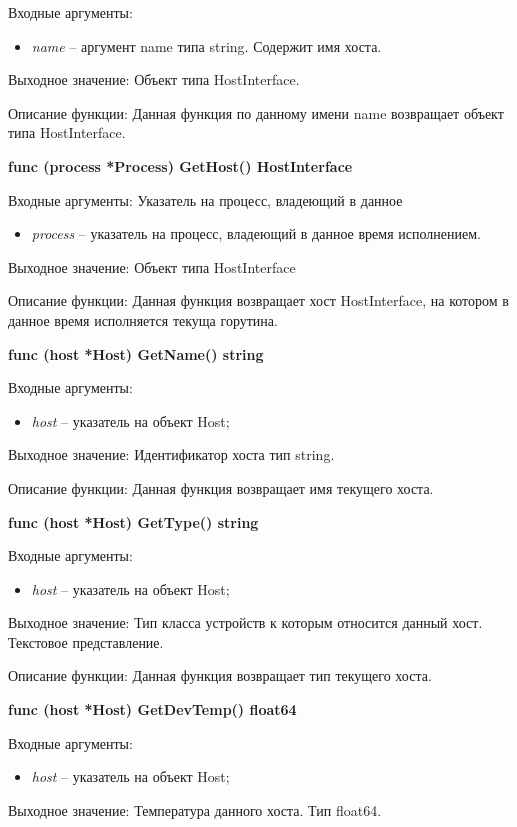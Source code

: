 Входные аргументы: 
\begin{itemize}
	\item \textit{name} -- аргумент name типа string. Содержит имя хоста.
\end{itemize}
Выходное значение: Объект типа HostInterface.

Описание функции: Данная функция по данному имени name возвращает объект типа HostInterface.


\textbf{func (process *Process) GetHost() HostInterface }

Входные аргументы: Указатель на процесс, владеющий в данное 
\begin{itemize}
	\item \textit{process} -- указатель на процесс, владеющий в данное время исполнением.
\end{itemize}
Выходное значение: Объект типа HostInterface

Описание функции: Данная функция возвращает хост HostInterface, на котором в данное время исполняется текуща горутина. 

\textbf{func (host *Host) GetName() string }

Входные аргументы:
\begin{itemize}
	\item \textit{host} -- указатель на объект Host;
\end{itemize}
Выходное значение: Идентификатор хоста тип string.

Описание функции: Данная функция возвращает имя текущего хоста.


\textbf{func (host *Host) GetType() string }

Входные аргументы: 
\begin{itemize}
	\item \textit{host} -- указатель на объект Host;
\end{itemize}
Выходное значение: Тип класса устройств к которым относится данный хост. Текстовое представление.

Описание функции: Данная функция возвращает тип текущего хоста.


\textbf{func (host *Host) GetDevTemp() float64 }

Входные аргументы: 
\begin{itemize}
	\item \textit{host} -- указатель на объект Host;
\end{itemize}

Выходное значение: Температура данного хоста. Тип float64.

